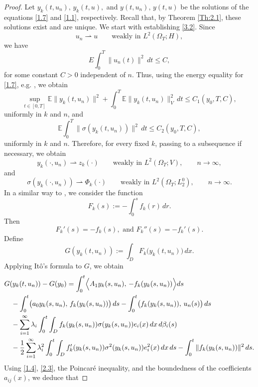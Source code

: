 \documentclass[a4paper,12pt]{article}
\numberwithin{equation}{section}
\def\E{\mathbb{E}}
\begin{document}
\begin{proof}
Let $y_k(t,u_n), \, y_k(t,u),$ and $y(t,u_n),\, y(t,u)$
be the solutions of the equations \eqref{1.7} and \eqref{1.1},
respectively. Recall that, by Theorem \ref{Th:2.1}, these solutions exist and are unique. We start with establishing  \eqref{3.2}. Since
\[
u_n \rightharpoonup u
\qquad\text{weakly in }L^2(\Omega_T;H),
\]
we have
\begin{equation}
E\int_0^T \|u_n(t)\|^2\,dt \le C,
\label{3.3}
\end{equation}
for some constant $C>0$ independent of $n$. Thus, using the energy equality for \eqref{1.7}, e.g. \cite[Theorem 2.1]{20}, we obtain 
\begin{equation}
\sup_{t\in[0,T]}
\E\|y_k(t,u_n)\|^2
+
\int_0^T
\E\|y_k(t,u_n)\|_V^2\,dt
\le
C_1(y_0,T,C),
\label{3.4}
\end{equation}
uniformly in $k$ and $n$, and
\begin{equation}
\E\int_0^T
\|\sigma(y_k(t,u_n))\|^2\,dt
\le
C_2(y_0,T,C),
\label{3.5}
\end{equation}
uniformly in $k$ and $n$. Therefore, for every fixed $k$, passing to a subsequence if
necessary, we obtain
\[
y_k(\cdot,u_n)
\rightharpoonup
z_k(\cdot)
\qquad\text{weakly in }
L^2(\Omega_T;V),
\qquad
n\to\infty,
\]
and
\[
\sigma(y_k(\cdot,u_n))
\rightharpoonup
\Phi_k(\cdot)
\qquad\text{weakly in }
L^2(\Omega_T;L_2^0),
\qquad
n\to\infty.
\]
In a similar way to \cite{20}, we consider the function
\[
F_k(s)
:=
-\int_0^s f_k(r)\,dr .
\]
Then
\[
F_k'(s)=-f_k(s),
 \text{  and   } 
F_k''(s)=-f_k'(s).
\]
Define
\[
G(y_k(t,u_n))
:=
\int_D
F_k\bigl(y_k(t,u_n)\bigr)\,dx .
\]
Applying It\^o's formula to $G$, we obtain
\begin{align}
& \nonumber G(y_k(t,u_n))-G(y_0)
 =
\int_0^t
\Bigl\langle
A_1y_k(s,u_n),
\,-f_k(y_k(s,u_n))
\Bigr\rangle ds
\\
\nonumber &\quad
-
\int_0^t
\bigl(
a_0y_k(s,u_n),
\,f_k(y_k(s,u_n))
\bigr)\,ds
-
\int_0^t
\bigl(
f_k(y_k(s,u_n)),
\,u_n(s)
\bigr)\,ds
\\
\nonumber &\quad
-
\sum_{i=1}^{\infty}
\lambda_i
\int_0^t
\int_D
f_k(y_k(s,u_n))
\sigma(y_k(s,u_n))
e_i(x)\,dx
\,d\beta_i(s) \\
&\quad
-
\frac12
\sum_{i=1}^{\infty}
\lambda_i^2
\int_0^t
\int_D
f_k'(y_k(s,u_n))
\sigma^2(y_k(s,u_n))
e_i^2(x)\,dx\,ds -\int_0^t
\|f_k(y_k(s,u_n))\|^2\, ds.
\label{3.6ast}
\end{align}
Using \eqref{1.4}, \eqref{2.3}, the Poincar\'e inequality,
and the boundedness of the coefficients $a_{ij}(x)$, we deduce that

\end{proof}
\end{document}
